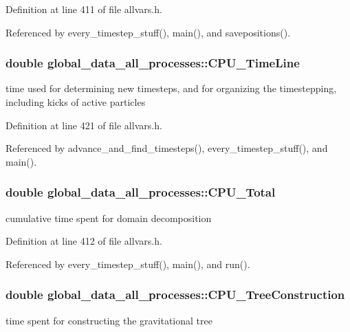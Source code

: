 Definition at line 411 of file allvars.h.



Referenced by every\_\-timestep\_\-stuff(), main(), and savepositions().

\hypertarget{structglobal__data__all__processes_a675f7230ece5f6d88fcc0384a8e1f6c9}{
\subsubsection[{CPU\_\-TimeLine}]{\setlength{\rightskip}{0pt plus 5cm}double {\bf global\_\-data\_\-all\_\-processes::CPU\_\-TimeLine}}}
\label{structglobal__data__all__processes_a675f7230ece5f6d88fcc0384a8e1f6c9}
time used for determining new timesteps, and for organizing the timestepping, including kicks of active particles 

Definition at line 421 of file allvars.h.



Referenced by advance\_\-and\_\-find\_\-timesteps(), every\_\-timestep\_\-stuff(), and main().

\hypertarget{structglobal__data__all__processes_a3d87cd9a94ce540341d4fb713b253c9e}{
\subsubsection[{CPU\_\-Total}]{\setlength{\rightskip}{0pt plus 5cm}double {\bf global\_\-data\_\-all\_\-processes::CPU\_\-Total}}}
\label{structglobal__data__all__processes_a3d87cd9a94ce540341d4fb713b253c9e}
cumulative time spent for domain decomposition 

Definition at line 412 of file allvars.h.



Referenced by every\_\-timestep\_\-stuff(), main(), and run().

\hypertarget{structglobal__data__all__processes_ac9eb650a8550b48eb464b6a0a8629a27}{
\subsubsection[{CPU\_\-TreeConstruction}]{\setlength{\rightskip}{0pt plus 5cm}double {\bf global\_\-data\_\-all\_\-processes::CPU\_\-TreeConstruction}}}
\label{structglobal__data__all__processes_ac9eb650a8550b48eb464b6a0a8629a27}
time spent for constructing the gravitational tree 

